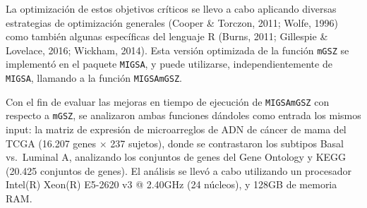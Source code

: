 \documentclass[12pt,twoside]{reedthesis}
\begin{document}
\par

La optimización de estos objetivos críticos se llevo a cabo aplicando diversas estrategias de optimización generales (Cooper \& Torczon, 2011; Wolfe, 1996) como también algunas específicas del lenguaje R (Burns, 2011; Gillespie \& Lovelace, 2016; Wickham, 2014). Esta versión optimizada de la función \texttt{mGSZ} se implementó en el paquete \texttt{MIGSA}, y puede utilizarse, independientemente de \texttt{MIGSA}, llamando a la función \texttt{MIGSAmGSZ}.

\par

Con el fin de evaluar las mejoras en tiempo de ejecución de \texttt{MIGSAmGSZ} con respecto a \texttt{mGSZ}, se analizaron ambas funciones dándoles como entrada los mismos input: la matriz de expresión de microarreglos de ADN de cáncer de mama del TCGA (16.207 genes \(\times\) 237 sujetos), donde se contrastaron los subtipos Basal vs.~Luminal A, analizando los conjuntos de genes del Gene Ontology y KEGG (20.425 conjuntos de genes). El análisis se llevó a cabo utilizando un procesador Intel(R) Xeon(R) E5-2620 v3 @ 2.40GHz (24 núcleos), y 128GB de memoria RAM.

\par
\end{document}
